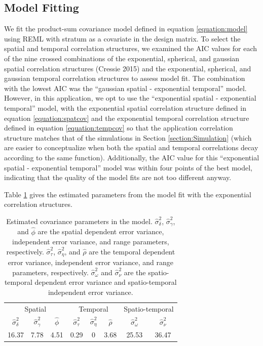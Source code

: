 \documentclass[smallextended]{svjour3}       %
\begin{document}
\hypertarget{subsection:modelfit}{%
\subsection{Model Fitting}\label{subsection:modelfit}}

We fit the product-sum covariance model defined in equation
\ref{equation:model} using REML with stratum as a covariate in the
design matrix. To select the spatial and temporal correlation
structures, we examined the AIC values for each of the nine crossed
combinations of the exponential, spherical, and gaussian spatial
correlation structures (Cressie 2015) and the exponential, spherical,
and gaussian temporal correlation structures to assess model fit. The
combination with the lowest AIC was the ``gaussian spatial - exponential
temporal'' model. However, in this application, we opt to use the
``exponential spatial - exponential temporal'' model, with the
exponential spatial correlation structure defined in equation
\ref{equation:spatcov} and the exponential temporal correlation
structure defined in equation \ref{equation:tempcov} so that the
application correlation structure matches that of the simulations in
Section \ref{section:Simulation} (which are easier to conceptualize when
both the spatial and temporal correlations decay according to the same
function). Additionally, the AIC value for this ``exponential spatial -
exponential temporal'' model was within four points of the best model,
indicating that the quality of the model fits are not too different
anyway.

Table \ref{tab:paramest} gives the estimated parameters from the model
fit with the exponential correlation structures.

\begin{table}[H]

\caption{\label{tab:paramest}Estimated covariance parameters in the model. $\hat{\sigma}^2_{\delta}$, $\hat{\sigma}^2_{\gamma}$, and $\hat{\phi}$ are the spatial dependent error variance, independent error variance, and range parameters, respectively. $\hat{\sigma}^2_{\tau}$, $\hat{\sigma}^2_{\eta}$, and $\hat{\rho}$ are the temporal dependent error variance, independent error variance, and range parameters, respectively. $\hat{\sigma}^2_{\omega}$ and $\hat{\sigma}^2_{\nu}$ are the spatio-temporal dependent error variance and spatio-temporal independent error variance.}
\centering
\begin{tabular}[t]{cccccccc}
\toprule
\multicolumn{3}{c}{Spatial} & \multicolumn{3}{c}{Temporal} & \multicolumn{2}{c}{Spatio-temporal} \\
\cmidrule(l{3pt}r{3pt}){1-3} \cmidrule(l{3pt}r{3pt}){4-6} \cmidrule(l{3pt}r{3pt}){7-8}
$\hat{\sigma}^2_{\delta}$ & $\hat{\sigma}^2_{\gamma}$ & $\hat{\phi}$ & $\hat{\sigma}^2_{\tau}$ & $\hat{\sigma}^2_{\eta}$ & $\hat{\rho}$ & $\hat{\sigma}^2_{\omega}$ & $\hat{\sigma}^2_{\nu}$\\
\midrule
16.37 & 7.78 & 4.51 & 0.29 & 0 & 3.68 & 25.53 & 36.47\\
\bottomrule
\end{tabular}
\end{table}
\end{document}
